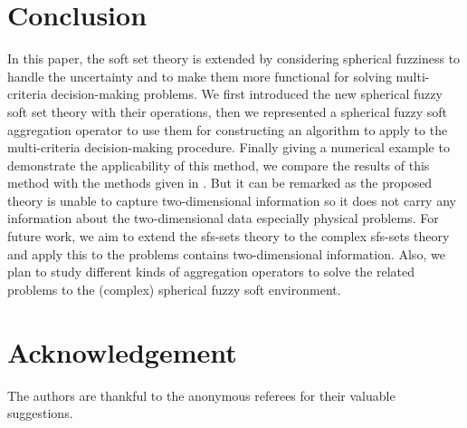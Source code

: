 \documentclass{IJFS}
\begin{document}
\section{Conclusion}
In this paper, the soft set theory is extended by considering
spherical fuzziness to handle the uncertainty and to make them
more functional for solving multi-criteria decision-making problems. We first
introduced the new spherical fuzzy soft set theory with their
operations, then we represented a spherical fuzzy soft aggregation
operator to use them for constructing an algorithm to apply to the multi-criteria
decision-making procedure. Finally giving a numerical example to
demonstrate the applicability of this method, we compare the
results of this method with the methods given in \cite{ah, gul, per, yang}. But it can be remarked as the proposed theory is unable to capture two-dimensional information so it does not carry any information about the two-dimensional data especially physical problems. For
future work, we aim to extend the sfs-sets theory to the complex sfs-sets theory and apply this to the problems contains two-dimensional information. Also, we plan to study different kinds of aggregation operators to solve the
related problems to the (complex) spherical fuzzy soft environment.








\section*{Acknowledgement}
The authors are thankful to the
anonymous referees for their valuable suggestions.\\
\end{document}
